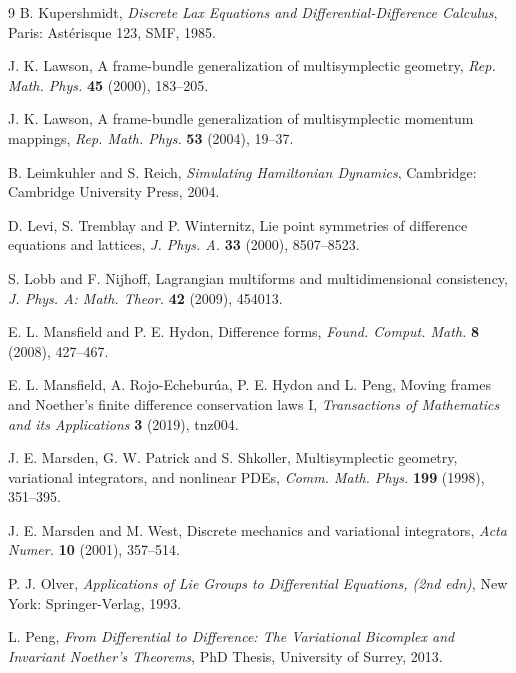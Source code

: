 \documentclass[11pt]{article} %
\numberwithin{equation}{section}
\theoremstyle{plain}
\theoremstyle{definition}
\begin{document}
\begin{thebibliography}{9}
 B. Kupershmidt, {\it Discrete Lax Equations and Differential-Difference Calculus}, Paris: Ast\'{e}risque 123, SMF, 1985.

 J. K. Lawson, A frame-bundle generalization of multisymplectic geometry, {\it Rep. Math. Phys.} {\bf 45} (2000), 183--205.
              
 J. K. Lawson, A frame-bundle generalization of multisymplectic momentum mappings, {\it Rep. Math. Phys.} {\bf 53} (2004), 19--37.
              
 B. Leimkuhler and S. Reich, {\it Simulating Hamiltonian Dynamics}, Cambridge: Cambridge University Press, 2004.

 D. Levi, S. Tremblay and P. Winternitz, Lie point symmetries of difference equations and lattices, {\it J. Phys. A.} {\bf 33} (2000), 8507--8523.

 S. Lobb and F. Nijhoff, Lagrangian multiforms and multidimensional consistency, {\it J. Phys. A: Math. Theor.} {\bf 42}  (2009), 454013.

 E. L. Mansfield and P. E. Hydon, Difference forms, {\it Found. Comput. Math.} {\bf 8} (2008), 427--467.

 E. L. Mansfield, A. Rojo-Echebur\'ua, P. E. Hydon and L. Peng, Moving frames and Noether's finite difference conservation laws I, {\it Transactions of Mathematics and its Applications} \textbf{3} (2019), tnz004. %

 J. E. Marsden, G. W. Patrick and S. Shkoller, Multisymplectic geometry, variational integrators, and nonlinear PDEs, {\it Comm. Math. Phys.} {\bf 199} (1998), 351--395.
               
 J. E. Marsden and M. West, Discrete mechanics and variational integrators, {\it Acta Numer.} {\bf 10} (2001), 357--514.


 P. J. Olver, {\it Applications of Lie Groups to Differential Equations, (2nd edn)}, New York: Springer-Verlag, 1993.

 L. Peng, {\it From Differential to Difference: The Variational Bicomplex and Invariant Noether's Theorems}, PhD Thesis, University of Surrey, 2013.


\end{thebibliography}
\end{document}
